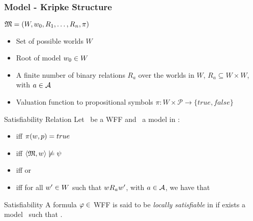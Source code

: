 \documentclass[10pt]{beamer}
\begin{document}
\begin{frame}
    \frametitle{Model - Kripke Structure} 
    \begin{center}
        {\Large
            $\mathfrak{M} = (W,w_0,R_1, \ldots, R_n, \pi )$
        }
    \end{center}

    \begin{itemize}[<+- | visible@+(1)->]
       \item Set of possible worlds $W$
       \item Root of model $w_0 \in W$
       \item A finite number of binary relations $R_a$ over the worlds in $W$,
           $R_a \subseteq W \times W$, with $a \in {\mathcal{A}}$
       \item Valuation function to propositional symbols $\pi : W \times \mathcal{P}
           \rightarrow \{true, false\}$
   \end{itemize} 
\end{frame}

\begin{frame}{Satisfiability Relation}
    Let \formula~be a WFF and \tuple~a model in :

    \begin{itemize}[<+- | visible@+(2)->]
        \item {} iff $\pi(w, p) = true$
        \item \sat{\Model}{\st}{\neg \psi} iff $\langle \mathfrak{M} , w \rangle
            \not \models \psi$
        \item \sat{\Model}{\st}{\psi \lor \delta} iff \sat{\Model}{\st}{\psi} or
            \sat{\Model}{\st}{\delta}
        \item {} iff for all $w' \in W$ such that
        $w R_a w'$, with $a \in {\mathcal{A}}$, we have that
    \end{itemize}
    
\end{frame}

\begin{frame}{Satisfiability}
    A formula $\varphi \in $ WFF is said to be \emph{locally satisfiable} in
     if exists a model \Model~such that
    .


    \vspace{0.6cm}


    \vspace{0.6cm}
\end{frame}
\end{document}

